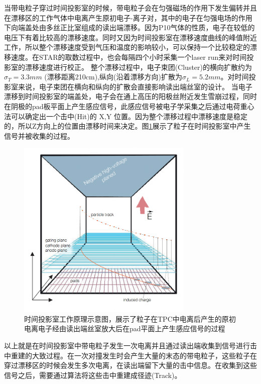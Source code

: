 当带电粒子穿过时间投影室的时候，带电粒子会在匀强磁场的作用下发生偏转并且在漂移区的工作气体中电离产生原初电子-离子对，其中的电子在匀强电场的作用下向端盖处由多丝正比室组成的读出端漂移。因为P10气体的性质，电子在较低的电压下有着比较高的漂移速度。同时又因为时间投影室在漂移速度曲线的峰值附近工作，所以整个漂移速度受到气压和温度的影响较小，可以保持一个比较稳定的漂移速度。在STAR的取数过程中，也会每隔四个小时采集一个laser run来对时间投影室的漂移速度进行校正。
整个漂移过程中，电子束团(Cluster)的横向扩散约为 $\sigma_{T} = 3.3mm$ (漂移距离210cm),纵向(沿着漂移方向)扩散为$\sigma_{L} = 5.2mm$。对时间投影室来说，电子束团在横向和纵向的扩散会直接影响读出端丝室的设计。
当电子漂移到时间投影室的端盖处，电子会在通上高压的阳极丝附近发生雪崩过程，同时在阴极的pad板平面上产生感应信号，此感应信号被电子学采集之后通过电荷重心法可以确定出一个击中(Hit)的 X,Y 位置。因为整个漂移过程中漂移速度是稳定的，所以Z方向上的位置由漂移时间来决定。图\ref{fig:HowTPCWrok}展示了粒子在时间投影室中产生信号并被收集的过程。

\begin{figure}[htb]
    \begin{center}
    \includegraphics[width=0.75\textwidth,clip]{figures/Chapter2/HowTPCWork.png}
    \end{center}
    \caption[时间投影室工作原理示意图]{时间投影室工作原理示意图，展示了粒子在TPC中电离后产生的原初电离电子经由读出端丝室放大后在pad平面上产生感应信号的过程}
    \label{fig:HowTPCWrok}
\end{figure}

以上就是在时间投影室中带电粒子发生一次电离并且通过读出端收集到信号进行击中重建的大致过程。在一次对撞发生时会产生大量的末态的带电粒子，这些粒子在穿过漂移区的时候会发生多次电离，在读出端留下大量的击中信息。在收集到这些信号之后，需要通过算法将这些击中重建成径迹(Track)。

